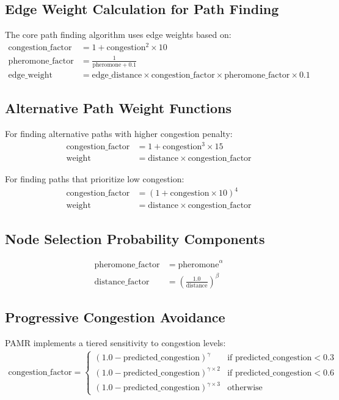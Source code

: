 \documentclass{article}
\begin{document}
\subsection{Edge Weight Calculation for Path Finding}
The core path finding algorithm uses edge weights based on:
\begin{align}
\text{congestion\_factor} &= 1 + \text{congestion}^2 \times 10 \\
\text{pheromone\_factor} &= \frac{1}{\text{pheromone} + 0.1} \\
\text{edge\_weight} &= \text{edge\_distance} \times \text{congestion\_factor} \times \text{pheromone\_factor} \times 0.1
\end{align}

\subsection{Alternative Path Weight Functions}
For finding alternative paths with higher congestion penalty:
\begin{align}
\text{congestion\_factor} &= 1 + \text{congestion}^3 \times 15 \\
\text{weight} &= \text{distance} \times \text{congestion\_factor}
\end{align}

For finding paths that prioritize low congestion:
\begin{align}
\text{congestion\_factor} &= (1 + \text{congestion} \times 10)^4 \\
\text{weight} &= \text{distance} \times \text{congestion\_factor}
\end{align}

\subsection{Node Selection Probability Components}
\begin{align}
\text{pheromone\_factor} &= \text{pheromone}^{\alpha} \\
\text{distance\_factor} &= \left(\frac{1.0}{\text{distance}}\right)^{\beta}
\end{align}

\subsection{Progressive Congestion Avoidance}
PAMR implements a tiered sensitivity to congestion levels:
\begin{align}
\text{congestion\_factor} = 
\begin{cases}
(1.0 - \text{predicted\_congestion})^{\gamma} & \text{if } \text{predicted\_congestion} < 0.3 \\
(1.0 - \text{predicted\_congestion})^{\gamma \times 2} & \text{if } \text{predicted\_congestion} < 0.6 \\
(1.0 - \text{predicted\_congestion})^{\gamma \times 3} & \text{otherwise}
\end{cases}
\end{align}
\end{document}
